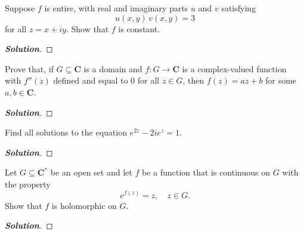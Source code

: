\documentclass[11pt]{article}
\newenvironment{problem}[2][Problem\!]{\begin{trivlist}
\item[\hskip \labelsep {\bfseries #1}\hskip \labelsep {\bfseries #2.}]}{\end{trivlist}}
\newenvironment{solution}{\begin{proof}[\textbf{\textit{Solution}}]}{\end{proof}}
\newcommand{\cc}{\mathbf C}   %
\begin{document}
\newpage  %

\begin{problem}{4.3}
Suppose $f$ is entire, with real and imaginary parts $u$ and $v$ satisfying
\[u(x, y)\, v(x, y) = 3\]
for all $z = x + i y$. Show that $f$ is constant.
\end{problem}
\begin{solution}
\end{solution}

\newpage  %

\begin{problem}{4.4}
Prove that, if $G \subseteq \cc$ is a domain and $f : G \to \cc$ is a complex-valued function with $f''(z)$ defined and equal to $0$ for all $z \in G$, then $f(z) = az + b$ for some $a, b \in \cc$. 
\end{problem}
\begin{solution}
\end{solution}

\newpage  %

\begin{problem}{4.5}
Find all solutions to the equation $e^{2z} - 2ie^z = 1$.
\end{problem}
\begin{solution}
\end{solution}


\newpage

\begin{problem}{4.6}
Let $G \subseteq \cc^*$ be an open set and let $f$ be a function that is continuous on $G$ with the property
\[e^{f(z)} = z,\quad z \in G.\]
Show that $f$ is holomorphic on $G$.
\end{problem}
\begin{solution}
\end{solution}

\end{document}
